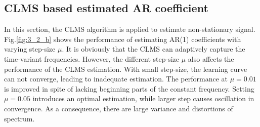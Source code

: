 \subsection{CLMS based estimated AR coefficient}
In this section, the CLMS algorithm is applied to estimate non-stationary signal. Fig.\ref{fig:3_2_b} shows the performance of estimating AR(1) coefficients with varying step-size $\mu$. It is obviously that the CLMS can adaptively capture the time-variant frequencies. However, the different step-size $\mu$ also affects the performance of the CLMS estimation. With small step-size, the learning curve can not converge, leading to inadequate estimation. The performance at $\mu=0.01$ is improved in spite of lacking beginning parts of the constant frequency. Setting $\mu=0.05$ introduces an optimal estimation, while larger step causes oscillation in convergence. As a consequence, there are large variance and distortions of spectrum.
